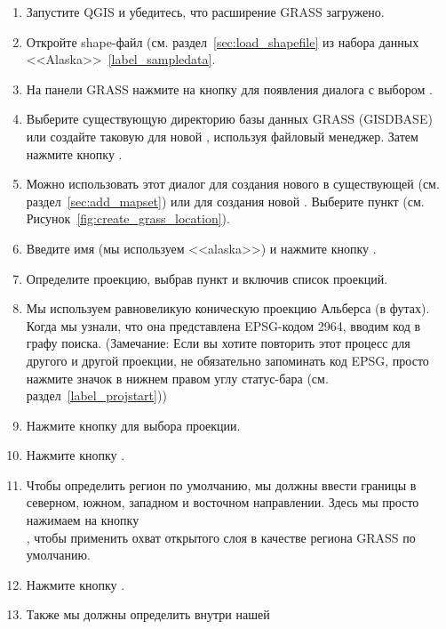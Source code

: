 \begin{enumerate}
  \item Запустите QGIS и убедитесь, что расширение GRASS загружено.
  \item Откройте shape-файл  (см. раздел~\ref{sec:load_shapefile}
  из набора данных <<Alaska>>~\ref{label_sampledata}.
  \item На панели GRASS нажмите на кнопку 
  для появления диалога с выбором .
  \item Выберите существующую директорию базы данных GRASS (GISDBASE)
   или создайте таковую для новой ,
  используя файловый менеджер. Затем нажмите кнопку .
  \item Можно использовать этот диалог для создания нового 
  в существующей  (см. раздел~\ref{sec:add_mapset}) или
  для создания новой . Выберите пункт
   (см. Рисунок~\ref{fig:create_grass_location}).
  \item Введите имя  (мы используем <<alaska>>) и
  нажмите кнопку .
  \item Определите проекцию, выбрав пункт 
  и включив список проекций.
  \item Мы используем равновеликую коническую проекцию Альберса (в футах).
  Когда мы узнали, что она представлена EPSG-кодом 2964, вводим код в
  графу поиска. (Замечание: Если вы хотите повторить этот процесс для
  другого  и другой проекции, не обязательно запоминать
  код EPSG, просто нажмите значок
  в нижнем правом углу статус-бара (см. раздел~\ref{label_projstart}))
  \item Нажмите кнопку  для выбора проекции.
  \item Нажмите кнопку .
  \item Чтобы определить регион по умолчанию, мы должны ввести границы
   в северном, южном, западном и восточном направлении.
  Здесь мы просто нажимаем на кнопку \\
  , чтобы применить охват
  открытого слоя  в качестве региона GRASS
  по умолчанию.
  \item Нажмите кнопку .
  \item Также мы должны определить  внутри нашей

\end{enumerate}
